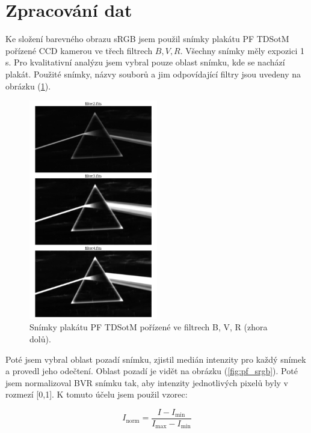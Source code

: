 \documentclass[a4paper,11pt,twocolumn]{article}
\begin{document}
    \section{Zpracování dat}
        Ke složení barevného obrazu sRGB jsem použil snímky plakátu PF TDSotM pořízené CCD kamerou ve třech filtrech $B, V, R$. Všechny snímky měly expozici 1 s. Pro kvalitativní analýzu jsem vybral pouze oblast snímku, kde se nachází plakát. Použité snímky, názvy souborů a jim odpovídající filtry jsou uvedeny na obrázku (\ref{fig:pf_ind}).

        \begin{figure}
            \centering
            \includegraphics[width=0.5\textwidth]{pf_ind}
            \caption{Snímky plakátu PF TDSotM pořízené ve filtrech B, V, R (zhora dolů).}
            \label{fig:pf_ind}
        \end{figure}
        
        Poté jsem vybral oblast pozadí snímku, zjistil medián intenzity pro každý snímek a provedl jeho odečtení. Oblast pozadí je vidět na obrázku (\ref{fig:pf_srgb}). Poté jsem normalizoval BVR snímku tak, aby intenzity jednotlivých pixelů byly v rozmezí [0,1]. K tomuto účelu jsem použil vzorec:  

        \begin{equation}
            I_{\text{norm}} = \frac{I - I_{\text{min}}}{I_{\text{max}} - I_{\text{min}}}
        \end{equation}
\end{document}
